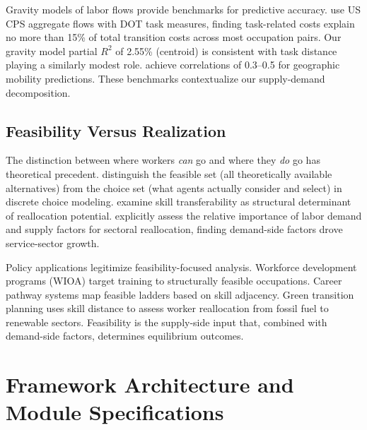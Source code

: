 \documentclass[12pt]{article}
\begin{document}
Gravity models of labor flows provide benchmarks for predictive accuracy. \citet{CortesGallipoli2018} use US CPS aggregate flows with DOT task measures, finding task-related costs explain no more than 15\% of total transition costs across most occupation pairs. Our gravity model partial $R^2$ of 2.55\% (centroid) is consistent with task distance playing a similarly modest role. \citet{SiminiEtAl2021} achieve correlations of 0.3--0.5 for geographic mobility predictions. These benchmarks contextualize our supply-demand decomposition.


\subsection{Feasibility Versus Realization}
\label{subsec:lit-feasibility}


The distinction between where workers \emph{can} go and where they \emph{do} go has theoretical precedent. \citet{BarseghyanEtAl2021} distinguish the feasible set (all theoretically available alternatives) from the choice set (what agents actually consider and select) in discrete choice modeling. \citet{YiMuellerStegmaier2017} examine skill transferability as structural determinant of reallocation potential. \citet{LeeWolpin2006} explicitly assess the relative importance of labor demand and supply factors for sectoral reallocation, finding demand-side factors drove service-sector growth.

Policy applications legitimize feasibility-focused analysis. Workforce development programs (WIOA) target training to structurally feasible occupations. Career pathway systems map feasible ladders based on skill adjacency. Green transition planning uses skill distance to assess worker reallocation from fossil fuel to renewable sectors. Feasibility is the supply-side input that, combined with demand-side factors, determines equilibrium outcomes.



\section{Framework Architecture and Module Specifications}
\label{sec:theory}
\end{document}
